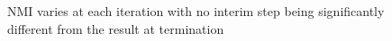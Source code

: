    
    \begin{figure}[h!]
        \begin{center}
            
            \caption{NMI varies at each iteration with no interim step being significantly different from the result at termination}
            \label{figure:results-constraint}
        \end{center}
    \end{figure}

